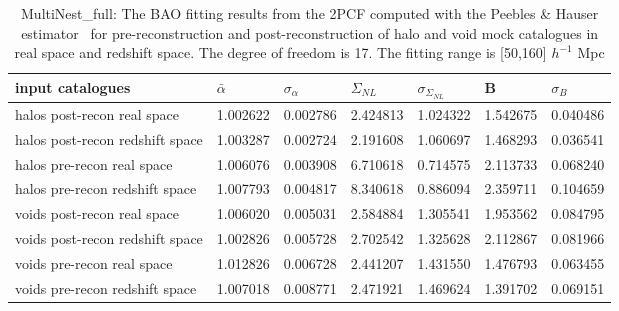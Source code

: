 \begin{table*}
\caption{MultiNest\_full: The BAO fitting results from the 2PCF computed with the Peebles \& Hauser estimator~\cite{Peebles1974} for pre-reconstruction and  post-reconstruction of halo and void mock catalogues in real space and redshift space. The degree of freedom is 17. The fitting range is [50,160] $h^{-1}$ Mpc}
\label{tab:LS}
\begin{tabular}{lllllll}
\hline
input catalogues                &$\bar{\alpha}$&$\sigma_{\alpha}$&     $\Sigma_{NL}$ & $\sigma_{\Sigma_{NL}}$&      B   & $\sigma_B$  \\
\hline
halos post-recon real space     & 1.002622 & 0.002786 & 2.424813 & 1.024322 & 1.542675 & 0.040486 \\
halos post-recon redshift space & 1.003287 & 0.002724 & 2.191608 & 1.060697 & 1.468293 & 0.036541 \\
halos pre-recon real space      & 1.006076 & 0.003908 & 6.710618 & 0.714575 & 2.113733 & 0.068240 \\
halos pre-recon redshift space  & 1.007793 & 0.004817 & 8.340618 & 0.886094 & 2.359711 & 0.104659 \\
\hline
voids post-recon real space     & 1.006020 & 0.005031 & 2.584884 & 1.305541 & 1.953562 & 0.084795 \\
voids post-recon redshift space & 1.002826 & 0.005728 & 2.702542 & 1.325628 & 2.112867 & 0.081966 \\
voids pre-recon real space      & 1.012826 & 0.006728 & 2.441207 & 1.431550 & 1.476793 & 0.063455 \\
voids pre-recon redshift space  & 1.007018 & 0.008771 & 2.471921 & 1.469624 & 1.391702 & 0.069151 \\
\hline
\end{tabular}
\end{table*}




